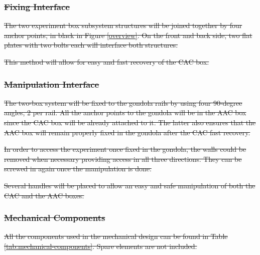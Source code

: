 \documentclass[a4paper,12pt,twoside, final]{article}
\providecommand{\DIFdeltex}[1]{{\protect\color{red}\sout{#1}}}                      %
\providecommand{\DIFdelbegin}{} %
\providecommand{\DIFdel}[1]{\texorpdfstring{\DIFdeltex{#1}}{}} %
\newcommand{\DIFscaledelfig}{0.5}
\newlength{\DIFdelgraphicswidth} %
\newlength{\DIFdelgraphicsheight} %
\newcommand{\DIFdelincludegraphics}[2][]{%
\sbox{\DIFdelgraphicsbox}{\DIFOincludegraphics[#1]{#2}}%
\settoboxwidth{\DIFdelgraphicswidth}{\DIFdelgraphicsbox} %
\settoboxtotalheight{\DIFdelgraphicsheight}{\DIFdelgraphicsbox} %
\scalebox{\DIFscaledelfig}{%
\parbox[b]{\DIFdelgraphicswidth}{\usebox{\DIFdelgraphicsbox}\\[-\baselineskip] \rule{\DIFdelgraphicswidth}{0em}}\llap{\resizebox{\DIFdelgraphicswidth}{\DIFdelgraphicsheight}{%
\setlength{\unitlength}{\DIFdelgraphicswidth}%
\begin{picture}(1,1)%
\thicklines\linethickness{2pt} %
{\color[rgb]{1,0,0}\put(0,0){\framebox(1,1){}}}%
{\color[rgb]{1,0,0}\put(0,0){\line( 1,1){1}}}%
{\color[rgb]{1,0,0}\put(0,1){\line(1,-1){1}}}%
\end{picture}%
}\hspace*{3pt}}} %
} %
\DeclareRobustCommand{\DIFdelbegin}{\DIFOdelbegin \let\includegraphics\DIFdelincludegraphics} %
\begin{document}
\DIFdelbegin \subsubsection{\DIFdel{Fixing Interface}}
\addtocounter{subsubsection}{-1}%

\DIFdel{The two experiment box subsystem structures will be joined together by four anchor points, in black in Figure \ref{overview}. On the front and back side, two flat plates with two bolts each will interface both structures. 
}%

\DIFdel{This method will allow for easy and fast recovery of the CAC box. 
 }%


\subsubsection{\DIFdel{Manipulation Interface}}
\addtocounter{subsubsection}{-1}%

\DIFdel{The two-box system will be fixed to the gondola rails by using four 90-degree angles, 2 per rail. All the anchor points to the gondola will be in the AAC box since the CAC box will be already attached to it. The latter also ensures that the AAC box will remain properly fixed in the gondola after the CAC fast recovery.
    }%

\DIFdel{In order to access the experiment once fixed in the gondola, the walls could be removed when necessary providing access in all three directions.
    They can be screwed in again once the manipulation is done.
}%

\DIFdel{Several handles will be placed to allow an easy and safe manipulation of both the CAC and the AAC boxes.
    }%

\subsubsection{\DIFdel{Mechanical Components}}
\addtocounter{subsubsection}{-1}%

\DIFdel{All the components used in the mechanical design can be found in Table \ref{tab:mechanical-components}.
    Spare elements are not included.
}%
\end{document}
